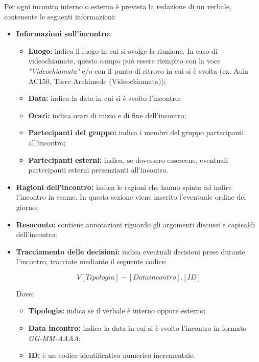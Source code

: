 \documentclass[../NormediProgetto.tex]{subfiles}
\begin{document}
Per ogni incontro interno o esterno è prevista la redazione di un verbale, contenente le seguenti informazioni:
\begin{itemize}
	\item \textbf{Informazioni sull'incontro:}
	\begin{itemize}
		\item \textbf{Luogo}: indica il luogo in cui si svolge la riunione. In caso di videochiamate, questo campo può essere riempito con la voce \textit{"Videochiamata"} e/o con il punto di ritrovo in cui si è svolta (ex: Aula AC150, Torre Archimede (Videochiamata));
		\item \textbf{Data:} indica la data in cui si è svolto l'incontro;
		\item \textbf{Orari:} indica orari di inizio e di fine dell'incontro;
		\item \textbf{Partecipanti del gruppo:} indica i membri del gruppo partecipanti all'incontro;
		\item \textbf{Partecipanti esterni:} indica, se dovessero essercene, eventuali partecipanti esterni presenzianti all'incontro.
	\end{itemize}
	
	\item \textbf{Ragioni dell'incontro:} indica le ragioni che hanno spinto ad indire l'incontro in esame. In questa sezione viene inserito l'eventuale ordine del giorno;
	
	\item \textbf{Resoconto:} contiene annotazioni riguardo gli argomenti discussi e capisaldi dell'incontro;
	
	\item \textbf{Tracciamento delle decisioni:} indica eventuali decisioni prese durante l'incontro, tracciate mediante il seguente codice:
	
	\[V[Tipologia]-[Data incontro].[ID]\]
	
	Dove:
	
	\begin{itemize}
		\item \textbf{Tipologia:} indica se il verbale è interno oppure esterno;
		\item \textbf{Data incontro:} indica la data in cui si è svolto l'incontro in formato \textit{GG-MM-AAAA};
		\item \textbf{ID:} è un codice identificativo numerico incrementale.
	\end{itemize}
	
\end{itemize}
\end{document}
